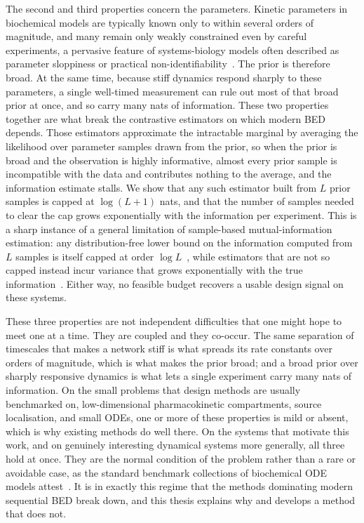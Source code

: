 The second and third properties concern the parameters. Kinetic parameters in biochemical
models are typically known only to within several orders of magnitude, and many remain only
weakly constrained even by careful experiments, a pervasive feature of systems-biology models
often described as parameter sloppiness or practical
non-identifiability~\citep{gutenkunst2007universally,raue2009identifiability,villaverde2016structural}.
The prior is therefore broad. At the same time, because stiff dynamics respond sharply to these parameters,
a single well-timed measurement can rule out most of that broad prior at once, and so carry
many nats of information. These two properties together are what break the contrastive
estimators on which modern BED depends. Those estimators approximate the intractable marginal
by averaging the likelihood over parameter samples drawn from the prior, so when the prior is
broad and the observation is highly informative, almost every prior sample is incompatible with
the data and contributes nothing to the average, and the information estimate stalls. We show
that any such estimator built from $L$ prior samples is capped at $\log(L+1)$ nats, and that the
number of samples needed to clear the cap grows exponentially with the information per
experiment. This is a sharp instance of a general limitation of sample-based
mutual-information estimation: any distribution-free lower bound on the information computed
from $L$ samples is itself capped at order $\log L$~\citep{mcallester2020formal}, while
estimators that are not so capped instead incur variance that grows exponentially with the true
information~\citep{song2020understanding}. Either way, no feasible budget recovers a usable
design signal on these systems.

These three properties are not independent difficulties that one might hope to meet one at a
time. They are coupled and they co-occur. The same separation of timescales that makes a network
stiff is what spreads its rate constants over orders of magnitude, which is what makes the prior
broad; and a broad prior over sharply responsive dynamics is what lets a single experiment carry
many nats of information. On the small problems that design methods are usually benchmarked on,
low-dimensional pharmacokinetic compartments, source localisation, and small ODEs, one or more
of these properties is mild or absent, which is why existing methods do well there. On the
systems that motivate this work, and on genuinely interesting dynamical systems more generally,
all three hold at once. They are the normal condition of the problem rather than a rare or
avoidable case, as the standard benchmark collections of biochemical ODE models
attest~\citep{hass2019benchmark,villaverde2016structural}. It is in exactly this regime that the
methods dominating modern sequential BED break down, and this thesis explains why and develops a
method that does not.

